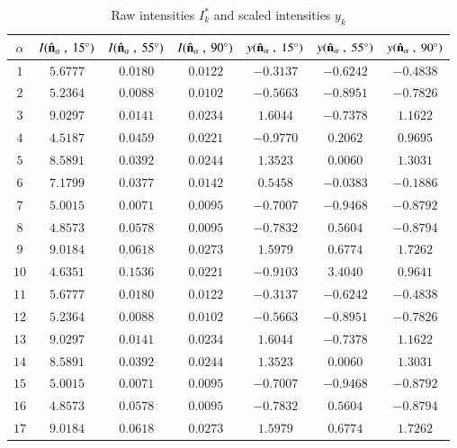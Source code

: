\documentclass[final,  3p]{elsarticle}
\begin{document}
\newpage
\begin{table}[h]
  \begin{center}
    \caption{\label{tab:A2}
      Raw intensities $I_k^*$ and scaled intensities $y_k$}
    \begin{tabular}{|c|c|c|c|c|c|c|}
      \hline\hline
      $\alpha$  & $I(\hat{\bf n}_\alpha\ ,\ 15^{\circ})$ &  $I(\hat{\bf n}_\alpha \ , \ 55^{\circ})$ &  $I(\hat{\bf n}_\alpha \ ,\ 90^{\circ})$ & $y(\hat{\bf n}_\alpha \ , \ 15^{\circ})$ & $y(\hat{\bf n}_\alpha \ , \ 55^{\circ})$ & $y(\hat{\bf n}_\alpha \ , \ 90^{\circ})$ \\
\hline
$1$  & $5.6777$ & $0.0180$ & $0.0122$ & $-0.3137$ & $-0.6242$ & $-0.4838$ \\
$2$  & $5.2364$ & $0.0088$ & $0.0102$ & $-0.5663$ & $-0.8951$ & $-0.7826$ \\
$3$  & $9.0297$ & $0.0141$ & $0.0234$ & $ 1.6044$ & $-0.7378$ & $ 1.1622$ \\
$4$  & $4.5187$ & $0.0459$ & $0.0221$ & $-0.9770$ & $ 0.2062$ & $ 0.9695$ \\
$5$  & $8.5891$ & $0.0392$ & $0.0244$ & $ 1.3523$ & $ 0.0060$ & $ 1.3031$ \\
$6$  & $7.1799$ & $0.0377$ & $0.0142$ & $ 0.5458$ & $-0.0383$ & $-0.1886$ \\
$7$  & $5.0015$ & $0.0071$ & $0.0095$ & $-0.7007$ & $-0.9468$ & $-0.8792$ \\
$8$  & $4.8573$ & $0.0578$ & $0.0095$ & $-0.7832$ & $ 0.5604$ & $-0.8794$ \\
$9$  & $9.0184$ & $0.0618$ & $0.0273$ & $ 1.5979$ & $ 0.6774$ & $ 1.7262$ \\
$10$ & $4.6351$ & $0.1536$ & $0.0221$ & $-0.9103$ & $ 3.4040$ & $ 0.9641$ \\
$11$ & $5.6777$ & $0.0180$ & $0.0122$ & $-0.3137$ & $-0.6242$ & $-0.4838$ \\
$12$ & $5.2364$ & $0.0088$ & $0.0102$ & $-0.5663$ & $-0.8951$ & $-0.7826$ \\
$13$ & $9.0297$ & $0.0141$ & $0.0234$ & $ 1.6044$ & $-0.7378$ & $ 1.1622$ \\
$14$ & $8.5891$ & $0.0392$ & $0.0244$ & $ 1.3523$ & $ 0.0060$ & $ 1.3031$ \\
$15$ & $5.0015$ & $0.0071$ & $0.0095$ & $-0.7007$ & $-0.9468$ & $-0.8792$ \\
$16$ & $4.8573$ & $0.0578$ & $0.0095$ & $-0.7832$ & $ 0.5604$ & $-0.8794$ \\
$17$ & $9.0184$ & $0.0618$ & $0.0273$ & $ 1.5979$ & $ 0.6774$ & $ 1.7262$ \\

\end{tabular}
\end{center}
\end{table}
\end{document}
